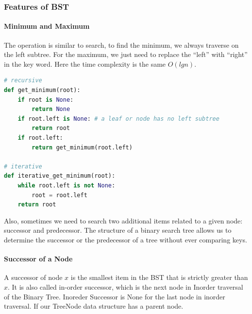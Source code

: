 \documentclass[data-structure.tex]{subfiles}
\begin{document}
\subsubsection{Features of BST}
\label{concept_features_bst}
\paragraph{Minimum and Maximum} The operation is similar to search, to find the minimum, we always traverse on the left subtree.  For the maximum, we just need to replace the ``left'' with ``right'' in the key word.  Here the time complexity is the same $O(lgn)$.
\begin{lstlisting}[language=Python]
# recursive
def get_minimum(root):
    if root is None:
        return None
    if root.left is None: # a leaf or node has no left subtree
        return root
    if root.left:
        return get_minimum(root.left)

# iterative
def iterative_get_minimum(root):
    while root.left is not None:
        root = root.left
    return root
\end{lstlisting}

Also, sometimes we need to search two additional items related to a given node:  successor and predecessor. The structure of a binary search tree allows us to determine the successor or the predecessor of a tree without ever comparing keys. 

\paragraph{Successor of a Node}  A successor of node $x$ is the smallest item in the BST that is strictly greater than $x$. It is also called in-order successor, which is the next node in Inorder traversal of the Binary Tree. Inoreder Successor is None for the last node in inorder traversal. If our TreeNode data structure has a parent node.
\end{document}

